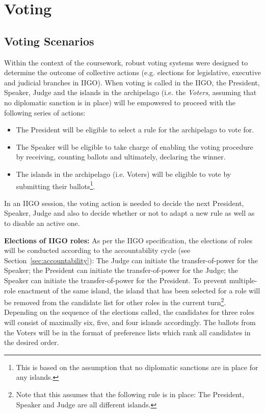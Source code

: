 \chapter{Voting}
\section{Voting Scenarios}
\label{sec:VotingScenarios}

Within the context of the coursework, robust voting systems were designed to determine the outcome of collective actions (e.g. elections for legislative, executive and judicial branches in IIGO).
When voting is called in the IIGO, the President, Speaker, Judge and the islands in the archipelago (i.e. the \emph{Voters}, assuming that no diplomatic sanction is in place) will be empowered to proceed with the following series of actions:
\begin{itemize}
    \item The President will be eligible to select a rule for the archipelago to vote for.
    \item The Speaker will be eligible to take charge of enabling the voting procedure by receiving, counting ballots and ultimately, declaring the winner.
    \item The islands in the archipelago (i.e. Voters) will be eligible to vote by submitting their ballots\footnote{This is based on the assumption that no diplomatic sanctions are in place for any islands.}.
\end{itemize}

In an IIGO session, the voting action is needed to decide the next President, Speaker, Judge and also to decide whether or not to adapt a new rule as well as to disable an active one.

\textbf{Elections of IIGO roles:} As per the IIGO specification, the elections of roles will be conducted according to the accountability cycle (see Section~\ref{sec:accountability}): The Judge can initiate the transfer-of-power for the Speaker; the President can initiate the transfer-of-power for the Judge; the Speaker can initiate the transfer-of-power for the President. To prevent multiple-role enactment of the same island, the island that has been selected for a role will be removed from the candidate list for other roles in the current turn\footnote{Note that this assumes that the following rule is in place: The President, Speaker and Judge are all different islands.}. Depending on the sequence of the elections called, the candidates for three roles will consist of maximally six, five, and four islands accordingly. The ballots from the Voters will be in the format of preference lists which rank all candidates in the desired order.

